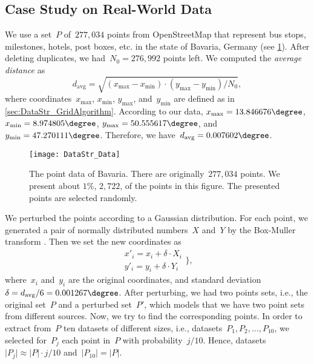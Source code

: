 \subsection{Case Study on Real-World Data}
\label{sec:DataStr_CaseStudy_RealData} 
We use a set~$P$ of~$277{,}034$ points 
from OpenStreetMap that represent 
bus stops, milestones, hotels, post boxes, etc. 
in the state of Bavaria, Germany 
(see \fig\ref{fig:DataStr_RealData}). 
After deleting duplicates, 
we had~$N_0=276{,}992$ points left. 
We computed the \emph{average distance} as
$$
d_\mathrm{avg}=\sqrt{(x_\mathrm{max}-x_\mathrm{min})\cdot 
(y_\mathrm{max}-y_\mathrm{min})/N_0},
$$
where coordinates~$x_\mathrm{max}$, $x_\mathrm{min}$, $y_\mathrm{max}$, 
and~$y_\mathrm{min}$ are defined as in 
\sect\ref{sec:DataStr_GridAlgorithm}.
According to our data, 
$x_\mathrm{max}=13.846676 \degree$, 
$x_\mathrm{min}=8.974805 \degree$, 
$y_\mathrm{max}=50.555617 \degree$,
and~$y_\mathrm{min}=47.270111 \degree$.
Therefore, we have~$d_\mathrm{avg}=0.007602 \degree$.


\begin{figure}[tb]
\centering
\texttt{[image: DataStr\_Data]}
\caption{The point data of Bavaria. 
	There are originally~$277{,}034$ points.
	We present about $1\%$, $2{,}722$, 
	of the points in this figure.
	The presented points are selected randomly.
}
\label{fig:DataStr_RealData}
\end{figure}

We perturbed the points 
according to a Gaussian distribution. 
For each point, we generated 
a pair of normally distributed numbers~$X$ and~$Y$ 
by the Box-Muller transform
\parencite[see][]{BoxMuller1958}. 
Then we set the new coordinates as
\begin{equation}
\begin{array}{l}
x'_i=x_i+\delta \cdot X_i  \\ 
y'_i=y_i+\delta \cdot Y_i
\end{array}
\bigg\}, \nonumber
\end{equation}
where~$x_i$ and~$y_i$ are the original coordinates, 
and standard deviation~$\delta =
d_\mathrm{avg}/6=0.001267 \degree$. 
After perturbing, we had two points sets, 
i.e., the original set~$P$ and a perturbed set~$P'$, 
which models that 
we have two point sets from different sources.
Now, we try to find the corresponding points. 
In order to extract from~$P$ 
ten datasets of different sizes,
i.e., datasets~$P_{1}, P_{2}, \ldots, P_{10}$, 
we selected for~$P_{j}$ each point in~$P$ 
with probability~$j/10$. 
Hence, datasets~$\vert P_{j}\vert \approx 
\vert P\vert \cdot j/10$ 
and~$\vert P_{10}\vert =\vert P\vert$.


